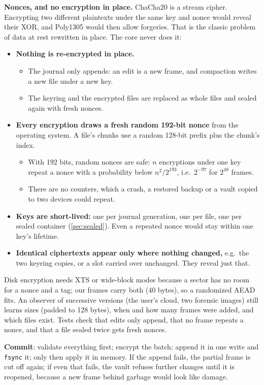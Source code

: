\documentclass[11pt,a4paper]{article}
\begin{document}
\noindent\textbf{Nonces, and no encryption in place.} ChaCha20 is a stream cipher. Encrypting two different plaintexts under the same key and nonce would reveal their XOR, and Poly1305 would then allow forgeries. That is the classic problem of data at rest rewritten in place. The core never does it:
\begin{itemize}
  \item \textbf{Nothing is re-encrypted in place.}
  \begin{itemize}
    \item The journal only appends: an edit is a new frame, and compaction writes a new file under a new key.
    \item The keyring and the encrypted files are replaced as whole files and sealed again with fresh nonces.
  \end{itemize}
  \item \textbf{Every encryption draws a fresh random 192-bit nonce} from the operating system. A file's chunks use a random 128-bit prefix plus the chunk's index.
  \begin{itemize}
    \item With 192 bits, random nonces are safe: $n$ encryptions under one key repeat a nonce with a probability below $n^2/2^{193}$, i.e.\ $2^{-97}$ for $2^{48}$ frames.
    \item There are no counters, which a crash, a restored backup or a vault copied to two devices could repeat.
  \end{itemize}
  \item \textbf{Keys are short-lived:} one per journal generation, one per file, one per sealed container (\cref{sec:sealed}). Even a repeated nonce would stay within one key's lifetime.
  \item \textbf{Identical ciphertexts appear only where nothing changed,} e.g.\ the two keyring copies, or a slot carried over unchanged. They reveal just that.
\end{itemize}
Disk encryption needs XTS or wide-block modes because a sector has no room for a nonce and a tag; our frames carry both (40 bytes), so a randomized AEAD fits. An observer of successive versions (the user's cloud, two forensic images) still learns sizes (padded to 128 bytes), when and how many frames were added, and which files exist. Tests check that edits only append, that no frame repeats a nonce, and that a file sealed twice gets fresh nonces.

\noindent\textbf{Commit}: validate everything first; encrypt the batch; append it in one write and \texttt{fsync} it; only then apply it in memory. If the append fails, the partial frame is cut off again; if even that fails, the vault refuses further changes until it is reopened, because a new frame behind garbage would look like damage.
\end{document}
